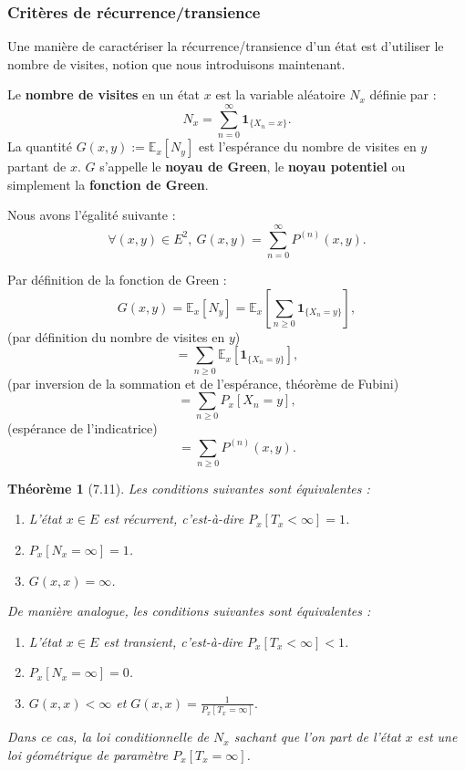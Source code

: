 \subsubsection{Critères de récurrence/transience}

Une manière de caractériser la récurrence/transience d’un état est d’utiliser le nombre de visites, notion que nous introduisons maintenant.

\begin{definition}[7.9]
Le \textbf{nombre de visites} en un état $x$ est la variable aléatoire $N_x$ définie par :
\[
N_x = \sum_{n=0}^{\infty} \mathbf{1}_{\{X_n = x\}}.
\]
La quantité $G(x, y) := \mathbb{E}_x[N_y]$ est l’espérance du nombre de visites en $y$ partant de $x$. $G$ s’appelle le \textbf{noyau de Green}, le \textbf{noyau potentiel} ou simplement la \textbf{fonction de Green}.
\end{definition}

\begin{lemme}[7.10]
Nous avons l’égalité suivante :
\[
\forall (x, y) \in E^2, \ G(x, y) = \sum_{n=0}^{\infty} P^{(n)}(x, y).
\]
\end{lemme}

\begin{demo}
Par définition de la fonction de Green :
\[
G(x, y) = \mathbb{E}_x[N_y] = \mathbb{E}_x \left[\sum_{n \geq 0} \mathbf{1}_{\{X_n = y\}}\right],
\]
(par définition du nombre de visites en $y$)
\[
= \sum_{n \geq 0} \mathbb{E}_x\left[\mathbf{1}_{\{X_n = y\}}\right],
\]
(par inversion de la sommation et de l’espérance, théorème de Fubini)
\[
= \sum_{n \geq 0} P_x[X_n = y],
\]
(espérance de l’indicatrice)
\[
= \sum_{n \geq 0} P^{(n)}(x, y).
\]
\end{demo}


\newtheorem{theoreme}{Théorème} 
\begin{theoreme}[7.11]
Les conditions suivantes sont équivalentes :
\begin{enumerate}
    \item L’état \(x \in E\) est récurrent, c'est-à-dire \(P_x[T_x < \infty] = 1\).
    \item \(P_x[N_x = \infty] = 1\).
    \item \(G(x, x) = \infty\).
\end{enumerate}

De manière analogue, les conditions suivantes sont équivalentes :
\begin{enumerate}
    \item L’état \(x \in E\) est transient, c'est-à-dire \(P_x[T_x < \infty] < 1\).
    \item \(P_x[N_x = \infty] = 0\).
    \item \(G(x, x) < \infty\) et \(G(x, x) = \frac{1}{P_x[T_x = \infty]}.\)
\end{enumerate}

Dans ce cas, la loi conditionnelle de \(N_x\) sachant que l’on part de l’état \(x\) est une loi géométrique de paramètre \(P_x[T_x = \infty]\).
\end{theoreme}

